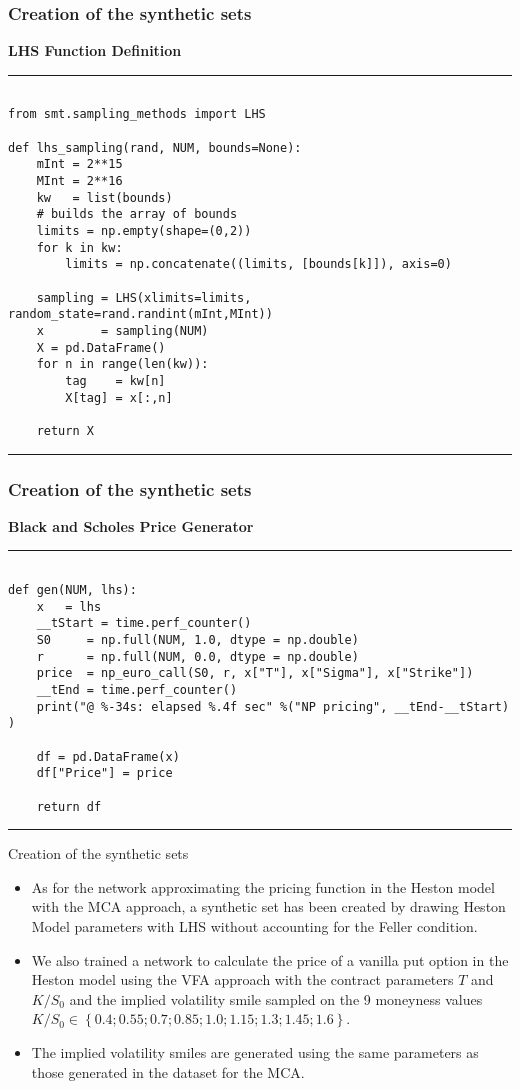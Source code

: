\documentclass[11pt]{beamer}
\begin{document}
\begin{frame}[fragile]
\frametitle{Creation of the synthetic sets}
\textbf{LHS Function Definition}
\rule{\textwidth}{1pt}
\scriptsize
\begin{verbatim}

from smt.sampling_methods import LHS

def lhs_sampling(rand, NUM, bounds=None):
    mInt = 2**15
    MInt = 2**16
    kw   = list(bounds)
    # builds the array of bounds
    limits = np.empty(shape=(0,2))
    for k in kw: 
        limits = np.concatenate((limits, [bounds[k]]), axis=0)

    sampling = LHS(xlimits=limits, random_state=rand.randint(mInt,MInt))
    x        = sampling(NUM)
    X = pd.DataFrame()
    for n in range(len(kw)):
        tag    = kw[n]
        X[tag] = x[:,n]

    return X

\end{verbatim}
\rule{\textwidth}{1pt}
\end{frame}
\begin{frame}[fragile]
\frametitle{Creation of the synthetic sets}
\textbf{Black and Scholes Price Generator}
\rule{\textwidth}{1pt}
\scriptsize
\begin{verbatim}

def gen(NUM, lhs):
    x   = lhs
    __tStart = time.perf_counter()
    S0     = np.full(NUM, 1.0, dtype = np.double)
    r      = np.full(NUM, 0.0, dtype = np.double)
    price  = np_euro_call(S0, r, x["T"], x["Sigma"], x["Strike"])
    __tEnd = time.perf_counter()
    print("@ %-34s: elapsed %.4f sec" %("NP pricing", __tEnd-__tStart) )

    df = pd.DataFrame(x)
    df["Price"] = price

    return df

\end{verbatim}
\rule{\textwidth}{1pt}
\end{frame}
\begin{frame}{Creation of the synthetic sets}
\begin{itemize}
\item As for the network approximating the pricing function in the Heston
model with the MCA approach, a synthetic set has been created by drawing Heston Model
parameters with LHS without accounting for the Feller condition.
\item We also trained a network to calculate the price of a vanilla put option in
the Heston model using the VFA approach with the contract parameters $T$
and $K/S_0$ and the implied volatility smile sampled on the 9 moneyness values
$K/S_0 \in \left\{0.4; 0.55; 0.7; 0.85; 1.0; 1.15; 1.3; 1.45; 1.6 \right\}$. 
\item The implied volatility
smiles are generated using the same parameters as those generated in the
dataset for the MCA.
\end{itemize}
\end{frame}
\end{document}
